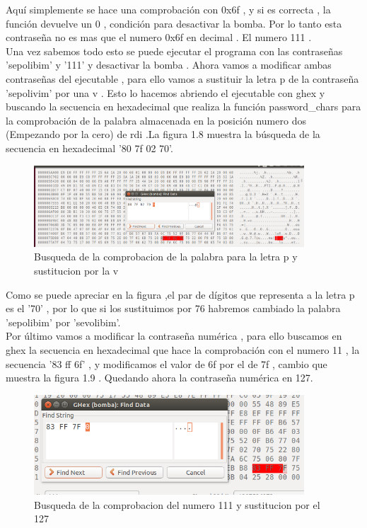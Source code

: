 	Aquí simplemente se hace una comprobación con 0x6f , y si es correcta , la función devuelve un 0 , condición para desactivar la bomba. 
	Por lo tanto esta contraseña no es mas que el numero 0x6f en decimal . El numero 111 .   \\
	
	Una vez sabemos todo esto se puede ejecutar el programa con las contraseñas 'sepolibim' y '111' y desactivar la bomba . Ahora vamos a modificar 
	ambas contraseñas del ejecutable , para ello vamos a sustituir la letra p de la contraseña 'sepolivim' por una v . Esto lo hacemos abriendo el ejecutable
	con ghex y buscando la secuencia en hexadecimal que realiza la función password\_chars para la comprobación de la palabra almacenada en la posición numero dos (Empezando por la cero) de rdi .La figura 1.8 muestra la búsqueda de la secuencia en hexadecimal '80 7f 02 70'.
	
	\begin{figure}[htb]
		\centering
		\includegraphics[width=0.9\textwidth]{./imagenes/10}
		\caption{Busqueda de la comprobacion de la palabra para la letra p y sustitucion por la v} \label{fig:1}
	\end{figure}
	
	Como se puede apreciar en la figura ,el par de dígitos que representa a la letra p es el '70' , por lo que si los sustituimos por 76 habremos cambiado la palabra 'sepolibim' por 'sevolibim'. \\
	
	Por último vamos a modificar la contraseña numérica , para ello buscamos en ghex la secuencia en hexadecimal que hace la comprobación con el numero 11 , la secuencia '83 ff 6f' , y modificamos el valor de 6f por el de 7f , cambio que muestra la figura 1.9 . Quedando ahora la contraseña numérica en 127.
	
	\begin{figure}[htb]
		\centering
		\includegraphics[width=0.9\textwidth]{./imagenes/11}
		\caption{Busqueda de la comprobacion del numero 111 y sustitucion por el 127} \label{fig:1}
	\end{figure}
	
